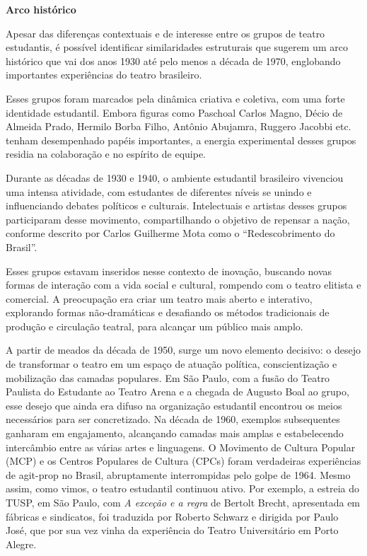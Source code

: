 \textbf{Arco histórico}

Apesar das diferenças contextuais e de interesse entre os grupos de
teatro estudantis, é possível identificar similaridades estruturais que
sugerem um arco histórico que vai dos anos 1930 até pelo menos a década
de 1970, englobando importantes experiências do teatro brasileiro.

Esses grupos foram marcados pela dinâmica criativa e coletiva, com uma
forte identidade estudantil. Embora figuras como Paschoal Carlos Magno,
Décio de Almeida Prado, Hermilo Borba Filho, Antônio Abujamra, Ruggero
Jacobbi etc. tenham desempenhado papéis importantes, a energia
experimental desses grupos residia na colaboração e no espírito de
equipe.

Durante as décadas de 1930 e 1940, o ambiente estudantil brasileiro
vivenciou uma intensa atividade, com estudantes de diferentes níveis se
unindo e influenciando debates políticos e culturais. Intelectuais e
artistas desses grupos participaram desse movimento, compartilhando o
objetivo de repensar a nação, conforme descrito por Carlos Guilherme
Mota como o “Redescobrimento do Brasil”.

Esses grupos estavam inseridos nesse contexto de inovação, buscando
novas formas de interação com a vida social e cultural, rompendo com o
teatro elitista e comercial. A preocupação era criar um teatro mais
aberto e interativo, explorando formas não-dramáticas e desafiando os
métodos tradicionais de produção e circulação teatral, para alcançar um
público mais amplo.

A partir de meados da década de 1950, surge um novo elemento decisivo: o
desejo de transformar o teatro em um espaço de atuação política,
conscientização e mobilização das camadas populares. Em São Paulo, com a
fusão do Teatro Paulista do Estudante ao Teatro Arena e a chegada de
Augusto Boal ao grupo, esse desejo que ainda era difuso na organização
estudantil encontrou os meios necessários para ser concretizado. Na
década de 1960, exemplos subsequentes ganharam em engajamento,
alcançando camadas mais amplas e estabelecendo intercâmbio entre as
várias artes e linguagens. O Movimento de Cultura Popular (MCP) e os
Centros Populares de Cultura (CPCs) foram verdadeiras experiências de
agit-prop no Brasil, abruptamente interrompidas pelo golpe de 1964.
Mesmo assim, como vimos, o teatro estudantil continuou ativo. Por
exemplo, a estreia do TUSP, em São Paulo, com \textit{A exceção e a regra}
de Bertolt Brecht, apresentada em fábricas e sindicatos, foi traduzida
por Roberto Schwarz e dirigida por Paulo José, que por sua vez vinha da
experiência do Teatro Universitário em Porto Alegre.

